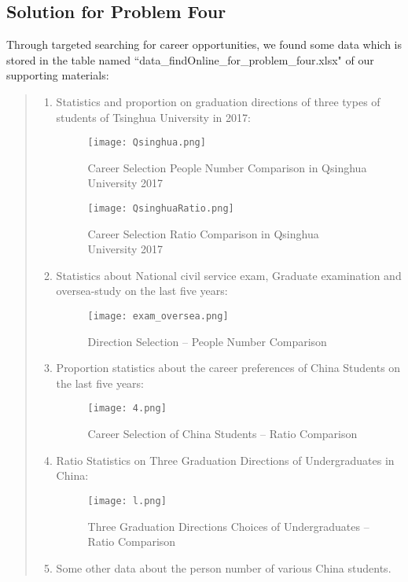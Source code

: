 \documentclass{mcmthesis}
\begin{document}
\subsection{Solution for Problem Four}
Through targeted searching for career opportunities, we found some data which is stored in the table named ``data\_findOnline\_for\_problem\_four.xlsx" of our supporting materials:
\begin{quote}
\begin{enumerate}
\item Statistics and proportion on graduation directions of three types of students of Tsinghua University in 2017:

\begin{figure}[h]
	\centering
	\texttt{[image: Qsinghua.png]}
	\caption{Career Selection People Number Comparison in Qsinghua University 2017} \label{fig:P4.2}
\end{figure}

\begin{figure}[h]
	\centering
	\texttt{[image: QsinghuaRatio.png]}
	\caption{Career Selection Ratio Comparison in Qsinghua University 2017} \label{fig:P4.3}
\end{figure}

\item Statistics about National civil service exam, Graduate examination and oversea-study on the last five years:

\begin{figure}[h]
	\centering
	\texttt{[image: exam\_oversea.png]}
	\caption{Direction Selection -- People Number Comparison} \label{fig:P4.1}
\end{figure}

\item Proportion statistics about the career preferences of China Students on the last five years:
\begin{figure}[h]
	\centering
	\texttt{[image: 4.png]}
	\caption{Career Selection of China Students --  Ratio Comparison } \label{fig:P4.4}
\end{figure}


\item Ratio Statistics on Three Graduation Directions of Undergraduates in China:
\begin{figure}[h]
	\centering
	\texttt{[image: l.png]}
	\caption{Three Graduation Directions Choices of Undergraduates --  Ratio Comparison } \label{fig:P4.5}
\end{figure}

\item Some other data about the person number of various China students.

\par\noindent
\end{enumerate}  
\end{quote}
\end{document}
